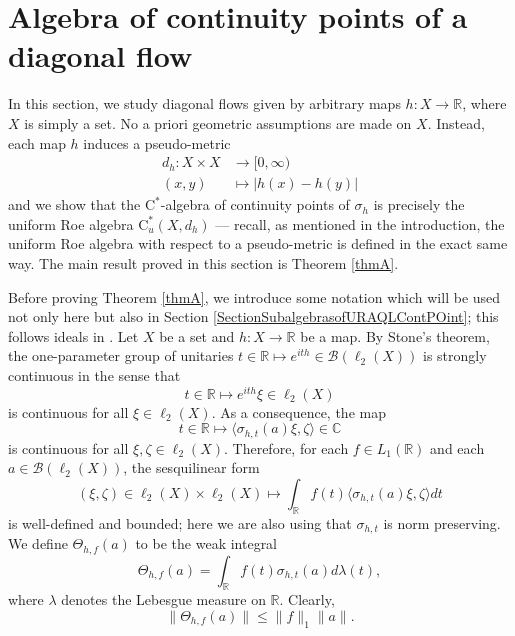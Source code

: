 \documentclass[11pt]{amsart}
\newcommand{\R}{\mathbb{R}}
\newcommand{\C}{\mathbb{C}}
\newcommand{\cB}{\mathcal{B}}
\newcommand{\cstu}{\mathrm{C}^*_u}
\newcommand{\cstar}{$\mathrm{C}^*$}
\numberwithin{equation}{section}
\theoremstyle{definition}
\theoremstyle{remark}
\begin{document}
\section{Algebra of continuity points of a diagonal flow}\label{SectionAlgContPoint}

In this section, we study diagonal  flows given by arbitrary maps $h\colon X\to \R$, where $X$ is simply a set. No a priori  geometric assumptions are made on $X$. Instead,  each  map $h$ induces a pseudo-metric
\begin{align*}
    d_h\colon  X\times X &\to [0,\infty)\\
    (x,y) &\mapsto |h(x)-h(y)|
\end{align*}
and we show that the \cstar-algebra of continuity points of $\sigma_h$ is precisely the uniform Roe algebra $\cstu(X,d_h)$ --- recall, as mentioned in the introduction, the uniform Roe algebra with respect to a pseudo-metric is defined in the exact same way. The main result proved in this section is Theorem \ref{thmA}.



 

 Before proving Theorem \ref{thmA}, we introduce some notation which will be used not only here but also in Section \ref{SectionSubalgebrasofURAQLContPOint}; this follows ideals in \cite[Section 2.2]{EwertMeyer2019CMP}.   Let $X$ be a set and $h\colon X\to \R$ be a map. By Stone's theorem, the one-parameter group of unitaries $t\in \R\mapsto e^{ith}\in \cB(\ell_2(X))$ is strongly continuous in the sense that
\[t\in \R\mapsto e^{ith}\xi\in \ell_2(X)\]
is continuous for all $\xi\in \ell_2(X)$. As a consequence, the map
\[t\in \R\mapsto \langle \sigma_{h,t}(a)\xi,\zeta\rangle\in \C\] is continuous for all $\xi,\zeta\in\ell_2(X)$.
Therefore, for each $f\in L_1(\R)$ and each $a\in \cB(\ell_2(X))$, the sesquilinear form
\[(\xi,\zeta)\in \ell_2(X)\times \ell_2(X)\mapsto \int_\R f(t)\langle \sigma_{h,t}(a)\xi,\zeta\rangle dt\]
is well-defined and bounded; here we are also using that $ \sigma_{h,t}$ is norm preserving. We define    $\Theta_{h,f}(a)$ to be the weak integral \begin{equation}\label{Eq.Theta.formula}\Theta_{h,f}(a)=\int_\R f(t) \sigma_{h,t}(a)  d\lambda(t),
\end{equation}
where $\lambda$ denotes the Lebesgue measure on $\R$.
 Clearly,
\begin{equation}\label{Eq.BoundNormThetafa}\|\Theta_{h,f}(a)\|\leq \|f\|_1\|a\|.
\end{equation}
\end{document}

